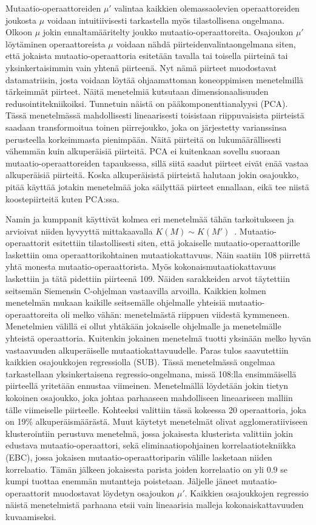 \documentclass{tktltiki}
\begin{document}
Mutaatio-operaattoreiden $\mu'$ valintaa kaikkien olemassaolevien operaattoreiden joukosta $\mu$ voidaan intuitiivisesti tarkastella myös tilastollisena ongelmana. Olkoon $\mu$ jokin ennaltamääritelty joukko mutaatio-operaattoreita. Osajoukon $\mu'$ löytäminen operaattoreista $\mu$ voidaan nähdä piirteidenvalintaongelmana siten, että jokaista mutaatio-operaattoria esitetään tavalla tai toisella piirteinä tai yksinkertaisimmin vain yhtenä piirteenä. Nyt nämä piirteet muodostavat datamatriisin, josta voidaan löytää ohjaamattoman koneoppimisen menetelmillä tärkeimmät piirteet. Näitä menetelmiä kutsutaan dimensionaalisuuden redusointitekniikoiksi. Tunnetuin näistä on pääkomponenttianalyysi (PCA). Tässä menetelmässä mahdollisesti lineaarisesti toisistaan riippuvaisista piirteistä saadaan transformoitua toinen piirrejoukko, joka on järjestetty varianssinsa perusteella korkeimmasta pienimpään. Näitä piirteitä on lukumäärällisesti vähemmän kuin alkuperäisiä piirteitä. PCA ei kuitenkaan sovellu suoraan mutaatio-operaattoreiden tapauksessa, sillä siitä saadut piirteet eivät enää vastaa alkuperäisiä piirteitä. Koska alkuperäisistä piirteistä halutaan jokin osajoukko, pitää käyttää jotakin menetelmää joka säilyttää piirteet ennallaan, eikä tee niistä koostepiirteitä kuten PCA:ssa. 

Namin ja kumppanit käyttivät kolmea eri menetelmää tähän tarkoitukseen ja arvioivat niiden hyvyyttä mittakaavalla $K(M) \sim K(M')$~\cite{NaminA06}. Mutaatio-operaattorit esitettiin tilastollisesti siten, että jokaiselle mutaatio-operaattorille laskettiin oma operaattorikohtainen mutaatiokattavuus. Näin saatiin 108 piirrettä yhtä monesta mutaatio-operaattorista. Myös kokonaismutaatiokattavuus laskettiin ja tätä pidettiin piirteenä 109. Näiden sarakkeiden arvot täytettiin seitsemän Siemensin C-ohjelman vastaavilla arvoilla. Kaikkien kolmen menetelmän mukaan kaikille seitsemälle ohjelmalle yhteisiä mutaatio-operaattoreita oli melko vähän: menetelmästä riippuen viidestä kymmeneen. Menetelmien välillä ei ollut yhtäkään jokaiselle ohjelmalle ja menetelmälle yhteistä operaattoria. Kuitenkin jokainen menetelmä tuotti yksinään melko hyvän vastaavuuden alkuperäiselle mutaatiokattavuudelle. Paras tulos saavutettiin kaikkien osajoukkojen regressiolla (SUB). Tässä menetelmässä ongelmaa tarkastellaan yksinkertaisena regressio-ongelmana, missä 108:lla ensimmäisellä piirteellä yritetään ennustaa viimeinen. Menetelmällä löydetään jokin tietyn kokoinen osajoukko, joka johtaa parhaaseen mahdolliseen lineaariseen malliin tälle viimeiselle piirteelle. Kohteeksi valittiin tässä kokeessa 20 operaattoria, joka on 19\% alkuperäismäärästä. Muut käytetyt menetelmät olivat agglomeratiiviseen klusterointiin perustuva menetelmä, jossa jokaisesta klusterista valittiin jokin edustava mutaatio-operaattori, sekä eliminaatiopohjainen korrelaatiotekniikka (EBC), jossa jokaisen mutaatio-operaattoriparin välille lasketaan niiden korrelaatio. Tämän jälkeen jokaisesta parista joiden korrelaatio on yli $0.9$ se kumpi tuottaa enemmän mutantteja poistetaan. Jäljelle jäneet mutaatio-operaattorit muodostavat löydetyn osajoukon $\mu'$. Kaikkien osajoukkojen regressio näistä menetelmistä parhaana etsii vain lineaarisia malleja kokonaiskattavuuden kuvaamiseksi. 
\end{document}
